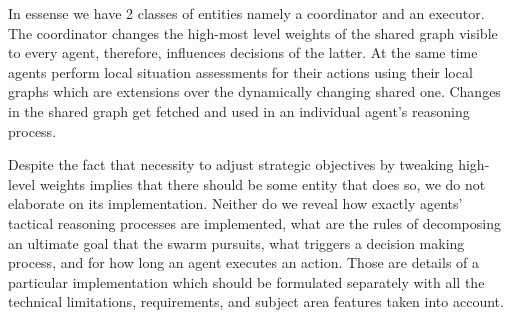 In essense we have 2 classes of entities namely a coordinator and an executor. The coordinator changes the high-most
level weights of the shared graph visible to every agent, therefore, influences decisions of the latter. At the same
time agents perform local situation assessments for their actions using their local graphs which are extensions over the
dynamically changing shared one. Changes in the shared graph get fetched and used in an individual agent's reasoning
process.

Despite the fact that necessity to adjust strategic objectives by tweaking high-level weights implies that there should be some entity that does so, we do not elaborate on its implementation.
Neither do we reveal how exactly agents' tactical reasoning processes are implemented, what are the rules of decomposing an ultimate goal that the swarm pursuits, what triggers a decision making process, and for how long an agent executes an action.
Those are details of a particular implementation which should be formulated separately with all the technical limitations, requirements, and subject area features taken into account.

